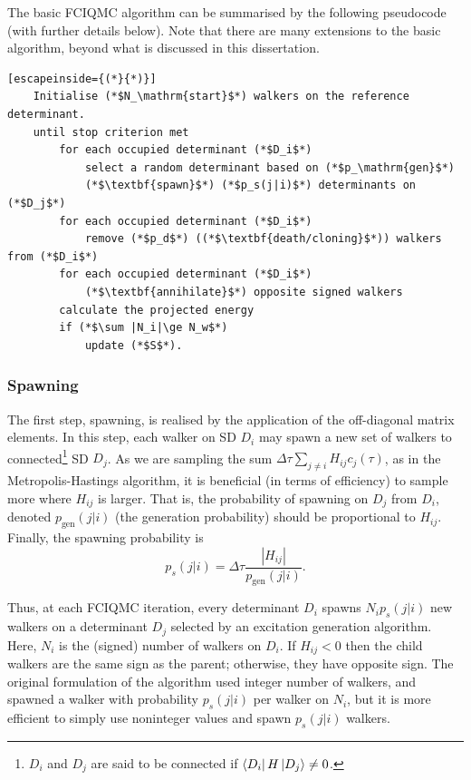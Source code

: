 The basic \gls{FCIQMC} algorithm can be summarised by the following pseudocode (with further details below). Note that there are many extensions to the basic algorithm, beyond what is discussed in this dissertation.

\begin{minipage}{\textwidth}
\begin{lstlisting}[escapeinside={(*}{*)}]
    Initialise (*$N_\mathrm{start}$*) walkers on the reference determinant.
    until stop criterion met
        for each occupied determinant (*$D_i$*)
            select a random determinant based on (*$p_\mathrm{gen}$*)
            (*$\textbf{spawn}$*) (*$p_s(j|i)$*) determinants on (*$D_j$*)
        for each occupied determinant (*$D_i$*)
            remove (*$p_d$*) ((*$\textbf{death/cloning}$*)) walkers from (*$D_i$*)
        for each occupied determinant (*$D_i$*)
            (*$\textbf{annihilate}$*) opposite signed walkers
        calculate the projected energy
        if (*$\sum |N_i|\ge N_w$*)
            update (*$S$*).
\end{lstlisting}
\end{minipage}

\subsubsection{Spawning}

The first step, spawning, is realised by the application of the off-diagonal matrix elements. In this step, each walker on \gls{SD} $D_i$ may spawn a new set of walkers to connected\footnote{$D_i$ and $D_j$ are said to be connected if $\bra{D_i}H\ket{D_j}\neq 0$.} \gls{SD} $D_j$. As we are sampling the sum $\Delta\tau\sum_{j\neq i} H_{ij}c_j(\tau)$, as in the Metropolis-Hastings algorithm, it is beneficial (in terms of efficiency) to sample more where $H_{ij}$ is larger. That is, the probability of spawning on $D_j$ from $D_i$, denoted $p_\mathrm{gen}(j|i)$ (the generation probability) should be proportional to $H_{ij}$. Finally, the spawning probability is
\begin{equation}
    p_s(j|i) = \Delta\tau\frac{|H_{ij}|}{p_\mathrm{gen}(j|i)}.
\end{equation}

Thus, at each FCIQMC iteration, every determinant $D_i$ spawns $N_ip_s(j|i)$ new walkers on a determinant $D_j$ selected by an excitation generation algorithm. Here, $N_i$ is the (signed) number of walkers on $D_i$. If $H_{ij} < 0$ then the child walkers are the same sign as the parent; otherwise, they have opposite sign. The original formulation of the algorithm used integer number of walkers, and spawned a walker with probability $p_s(j|i)$ per walker on $N_i$, but it is more efficient to simply use noninteger values and spawn $p_s(j|i)$ walkers.


